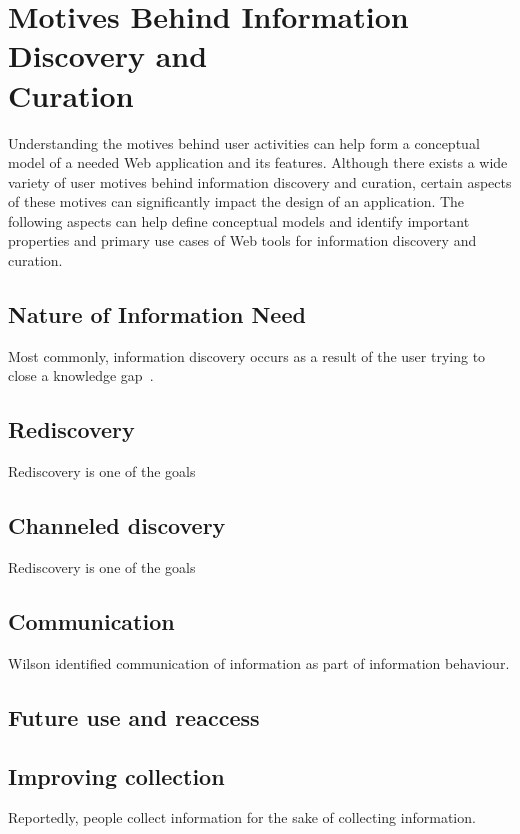{\section{Motives Behind Information Discovery and \\ Curation}
Understanding the motives behind user activities can help form a conceptual model of a needed Web application and its features. Although there exists a wide variety of user motives behind information discovery and curation, certain aspects of these motives can significantly impact the design of an application. The following aspects can help define conceptual models and identify important properties and primary use cases of Web tools for information discovery and curation.  


{\subsection{Nature of Information Need}
Most commonly, information discovery occurs as a result of the user trying to close a knowledge gap~\cite{}.

}


{\subsection{Rediscovery}
Rediscovery is one of the goals


}

{\subsection{Channeled discovery}
Rediscovery is one of the goals


}
{\subsection{Communication}
Wilson identified communication of information as part of information behaviour.
}

{\subsection{Future use and reaccess}
}

{\subsection{Improving collection}
Reportedly, people collect information for the sake of collecting information. 

}
}


